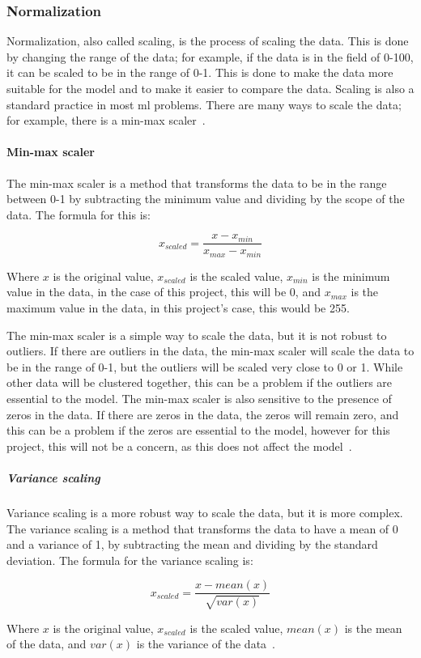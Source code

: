 \subsubsection{Normalization}\label{sec:normalization}
Normalization, also called scaling, is the process of scaling the data. This is done by changing the range of the data; for example, if the data is in the field of 0-100, it can be scaled to be in the range of 0-1. This is done to make the data more suitable for the model and to make it easier to compare the data. Scaling is also a standard practice in most \gls{ml} problems. There are many ways to scale the data; for example, there is a min-max scaler~\cite{Feature-engineering-zheng}.


\paragraph{Min-max scaler}\label{subsec:min-max}
The min-max scaler is a method that transforms the data to be in the range between 0-1 by subtracting the minimum value and dividing by the scope of the data. The formula for this is:

\begin{equation}
    x_{scaled} = \frac{x - x_{min}}{x_{max} - x_{min}}
\end{equation}

Where $x$ is the original value, $x_{scaled}$ is the scaled value, $x_{min}$ is the minimum value in the data, in the case of this project, this will be 0, and $x_{max}$ is the maximum value in the data, in this project's case, this would be 255.

The min-max scaler is a simple way to scale the data, but it is not robust to outliers. If there are outliers in the data, the min-max scaler will scale the data to be in the range of 0-1, but the outliers will be scaled very close to 0 or 1. While other data will be clustered together, this can be a problem if the outliers are essential to the model. The min-max scaler is also sensitive to the presence of zeros in the data. If there are zeros in the data, the zeros will remain zero, and this can be a problem if the zeros are essential to the model, however for this project, this will not be a concern, as this does not affect the model~\cite{Feature-engineering-zheng}.

\subparagraph{Variance scaling}\label{sec:variance-scaling}
Variance scaling is a more robust way to scale the data, but it is more complex. The variance scaling is a method that transforms the data to have a mean of 0 and a variance of 1, by subtracting the mean and dividing by the standard deviation. The formula for the variance scaling is:

\begin{equation}
    x_{scaled} = \frac{x - mean(x)}{\sqrt{var(x)}}
\end{equation}

Where $x$ is the original value, $x_{scaled}$ is the scaled value, $mean(x)$ is the mean of the data, and $var(x)$ is the variance of the data~\cite{Feature-engineering-zheng}.